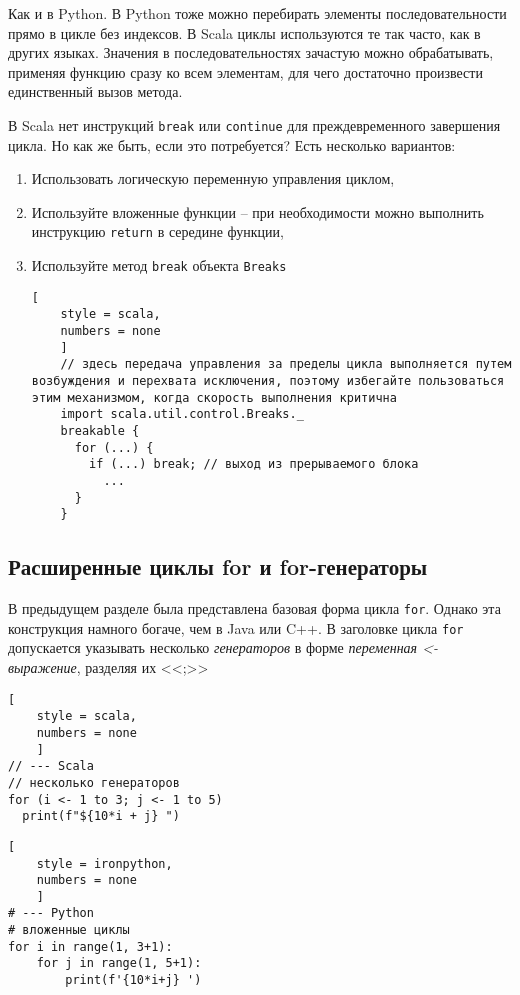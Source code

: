 \documentclass[%
	11pt,
	a4paper,
	utf8,
		]{article}
\begin{document}
Как и в Python. В Python тоже можно перебирать элементы последовательности прямо в цикле без индексов. В Scala циклы используются те так часто, как в других языках. Значения в последовательностях зачастую можно обрабатывать, применяя функцию сразу ко всем элементам, для чего достаточно произвести единственный вызов метода.

В Scala нет инструкций \texttt{break} или \texttt{continue} для преждевременного завершения цикла. Но как же быть, если это потребуется? Есть несколько вариантов:
\begin{enumerate}
	\item Использовать логическую переменную управления циклом,
	
	\item Используйте вложенные функции -- при необходимости можно выполнить инструкцию \texttt{return} в середине функции,
	
	\item Используйте метод \texttt{break} объекта \texttt{Breaks}
	\begin{lstlisting}[
	style = scala,
	numbers = none
	]
	// здесь передача управления за пределы цикла выполняется путем возбуждения и перехвата исключения, поэтому избегайте пользоваться этим механизмом, когда скорость выполнения критична
	import scala.util.control.Breaks._
	breakable {
	  for (...) {
	    if (...) break; // выход из прерываемого блока
	      ...
	  }
	}
	\end{lstlisting}
\end{enumerate}

\subsection{Расширенные циклы for и for-генераторы}

В предыдущем разделе была представлена базовая форма цикла \texttt{for}. Однако эта конструкция намного богаче, чем в Java или C++. В заголовке цикла \texttt{for} допускается указывать несколько \emph{генераторов} в форме \textit{переменная <- выражение}, разделяя их <<;>>

\begin{minipage}[t]{0.45\textwidth}
	\begin{lstlisting}[
	style = scala,
	numbers = none	
	]
// --- Scala
// несколько генераторов
for (i <- 1 to 3; j <- 1 to 5)
  print(f"${10*i + j} ")
	\end{lstlisting}
\end{minipage}
\hspace*{2mm}
\begin{minipage}[t]{0.45\textwidth}
	\begin{lstlisting}[
	style = ironpython,
	numbers = none	
	]
# --- Python
# вложенные циклы
for i in range(1, 3+1):
    for j in range(1, 5+1):
        print(f'{10*i+j} ')
	\end{lstlisting}
\end{minipage}
\end{document}
